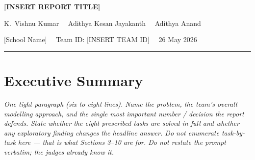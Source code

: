 \documentclass[12pt,a4paper]{article}
\newcommand{\ph}[1]{\textit{\textcolor{phgray}{#1}}}
\begin{document}
\begin{center}
{\Large\bfseries [INSERT REPORT TITLE]\par}
\vspace{0.15em}
{\normalsize K.\ Vishnu Kumar \ \textperiodcentered\ Adithya Kesan Jayakanth \ \textperiodcentered\ Adithya Anand\par}
\vspace{0.05em}
{\small [School Name] \ \textperiodcentered\ Team ID: [INSERT TEAM ID] \ \textperiodcentered\ 26 May 2026\par}
\end{center}
\noindent\rule{\linewidth}{0.4pt}

\section{Executive Summary}
\ph{One tight paragraph (six to eight lines). Name the problem, the team's overall modelling approach, and the single most important number / decision the report defends. State whether the eight prescribed tasks are solved in full and whether any exploratory finding changes the headline answer. Do not enumerate task-by-task here — that is what Sections 3--10 are for. Do not restate the prompt verbatim; the judges already know it.}

\end{document}
